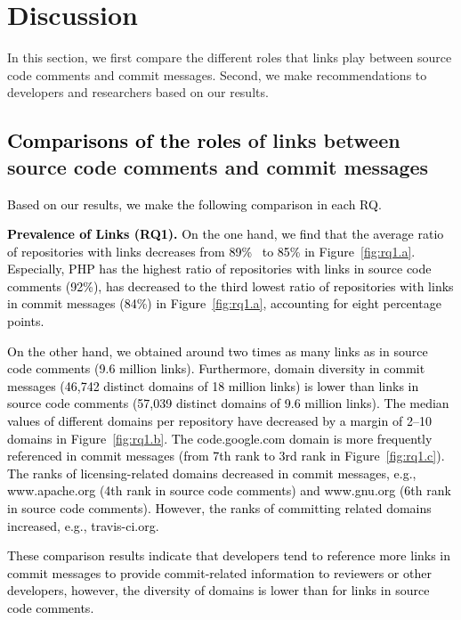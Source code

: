 \documentclass[smallextended]{svjour3}       %
\newcommand{\fix}[1]{\textcolor{black}{#1}}
\begin{document}
\section{Discussion}
\label{sec:ds}
In this section, we first compare the different roles that links play between source code comments and commit messages. Second, we make recommendations to developers and researchers based on our results.


\subsection{\fix{Comparisons of the roles} of links between source code comments and commit messages}
\fix{Based on our results, we make the following comparison in each RQ.}

\fix{\textbf{Prevalence of Links (RQ1).}
On the one hand, we find that the average ratio of repositories with links decreases from \fix{89}\%~\citep{hata20199} to 85\% in Figure~\ref{fig:rq1.a}. Especially, PHP has the highest ratio of repositories with links in source code comments (92\%), has decreased to the third lowest ratio of repositories with links in commit messages (84\%) in Figure~\ref{fig:rq1.a}, accounting for eight percentage points.}

\fix{On the other hand, we obtained around two times as many links as in source code comments (9.6 million links). Furthermore, domain diversity in commit messages (46,742 distinct domains of 18 million links) is lower than links in source code comments (57,039 distinct domains of 9.6 million links). The median values of different domains per repository have decreased by a margin of 2--10 domains in Figure~\ref{fig:rq1.b}. The \textsf{code.google.com} domain is more frequently referenced in commit messages (from 7th rank to 3rd rank in Figure~\ref{fig:rq1.c}). The ranks of licensing-related domains decreased in commit messages, e.g., \textsf{www.apache.org} (4th rank in source code comments) and \textsf{www.gnu.org} (6th rank in source code comments). However, the ranks of committing related domains increased, e.g., \textsf{travis-ci.org}.}

\fix{These comparison results indicate that developers tend to reference more links in commit messages to provide commit-related information to reviewers or other developers, however, the diversity of domains is lower than for links in source code comments.}
\end{document}
